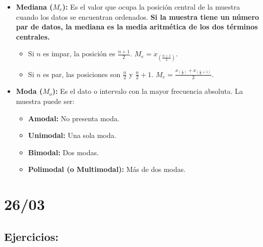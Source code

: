\documentclass[12pt, letterpaper]{article}
\begin{document}
\begin{itemize}
    \item \textbf{Mediana ($M_e$):} Es el valor que ocupa la posición central de la muestra cuando los datos se encuentran ordenados. \textbf{Si la muestra tiene un número par de datos, la mediana es la media aritmética de los dos términos centrales.}
        \begin{itemize}
            \item Si $n$ es impar, la posición es $\frac{n+1}{2}$. $M_e = x_{(\frac{n+1}{2})}$.
            \item Si $n$ es par, las posiciones son $\frac{n}{2}$ y $\frac{n}{2}+1$. $M_e = \frac{x_{(\frac{n}{2})} + x_{(\frac{n}{2}+1)}}{2}$.
        \end{itemize}
    \item \textbf{Moda ($M_o$):} Es el dato o intervalo con la mayor frecuencia absoluta. La muestra puede ser:
        \begin{itemize}
            \item \textbf{Amodal:} No presenta moda.
            \item \textbf{Unimodal:} Una sola moda.
            \item \textbf{Bimodal:} Dos modas.
            \item \textbf{Polimodal (o Multimodal):} Más de dos modas.
        \end{itemize}
\end{itemize}
\newpage

\section{26/03}
\subsection{Ejercicios:}
\end{document}
